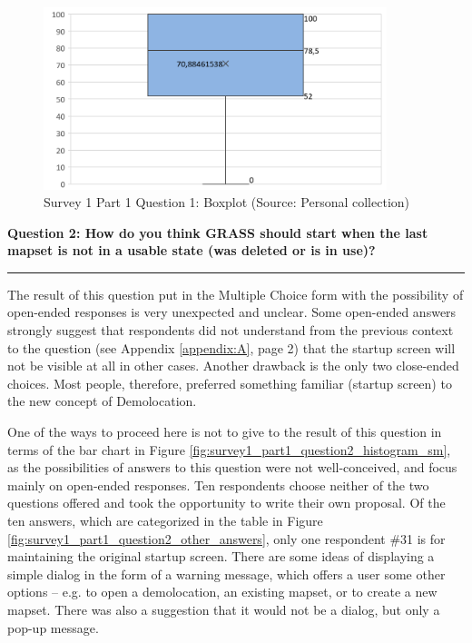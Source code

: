 \documentclass[a4paper,10pt,twoside]{article}
\begin{document}
\vspace{0.3cm}
\begin{figure}[hbt!] 
\begin{center}
\includegraphics[width=10cm]{../surveys/analyzed_data/survey1_part1_question1_excel_boxplot.png} 
\caption[Survey 1 Part 1 Question 1: Boxplot]{Survey 1 Part 1 Question 1: Boxplot (Source: Personal collection)}
\label{fig:survey1_part1_question1_boxplot}
\end{center}
\end{figure}

\newpage
\noindent \textbf{Question 2: How do you think GRASS should start when the last mapset is not in a usable state (was deleted or is in use)?}
\par\noindent\rule{\textwidth}{0.4pt}

\noindent The result of this question put in the Multiple Choice form
with the possibility of open-ended responses is very unexpected and
unclear. Some open-ended answers strongly suggest that respondents did
not understand from the previous context to the question (see Appendix
\ref{appendix:A}, page 2) that the startup screen will not be visible
at all in other cases. Another drawback is the only two close-ended
choices. Most people, therefore, preferred something familiar (startup
screen) to the new concept of Demolocation.

One of the ways to proceed here is not to give to the result of this
question in terms of the bar chart in Figure
\ref{fig:survey1_part1_question2_histogram_sm}, as the possibilities
of answers to this question were not well-conceived, and focus mainly
on open-ended responses. Ten respondents choose neither of the two
questions offered and took the opportunity to write their own
proposal. Of the ten answers, which are categorized in the table in
Figure \ref{fig:survey1_part1_question2_other_answers}, only one
respondent \#31 is for maintaining the original startup screen. There
are some ideas of displaying a simple dialog in the form of a warning
message, which offers a user some other options -- e.g. to open a
demolocation, an existing mapset, or to create a new mapset. There was
also a suggestion that it would not be a dialog, but only a pop-up
message.
\end{document}
